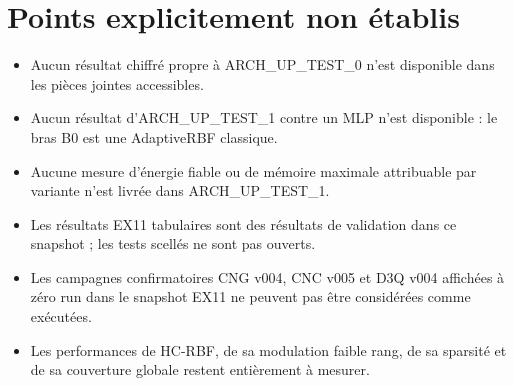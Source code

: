 \documentclass[11pt,a4paper]{article}
\newcommand{\HC}{\textsc{HC-RBF}}
\begin{document}
\section{Points explicitement non établis}

\begin{itemize}[itemsep=0.04em,topsep=0.08em,parsep=0pt]
\small
  \item Aucun résultat chiffré propre à ARCH\_UP\_TEST\_0 n'est disponible dans les pièces jointes accessibles.
  \item Aucun résultat d'ARCH\_UP\_TEST\_1 contre un MLP n'est disponible : le bras B0 est une AdaptiveRBF classique.
  \item Aucune mesure d'énergie fiable ou de mémoire maximale attribuable par variante n'est livrée dans ARCH\_UP\_TEST\_1.
  \item Les résultats EX11 tabulaires sont des résultats de validation dans ce snapshot ; les tests scellés ne sont pas ouverts.
  \item Les campagnes confirmatoires CNG v004, CNC v005 et D3Q v004 affichées à zéro run dans le snapshot EX11 ne peuvent pas être considérées comme exécutées.
  \item Les performances de \HC, de sa modulation faible rang, de sa sparsité et de sa couverture globale restent entièrement à mesurer.
\end{itemize}
\end{document}
